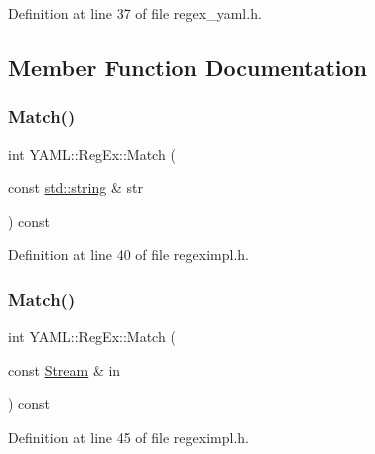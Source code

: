Definition at line 37 of file regex\+\_\+yaml.\+h.



\subsection{Member Function Documentation}
\mbox{\label{class_y_a_m_l_1_1_reg_ex_aec5a2989ce40d29a7ff9041943a957cf}} 
\subsubsection{\texorpdfstring{Match()}{Match()}\hspace{0.1cm}{\footnotesize\ttfamily [1/3]}}
{\footnotesize\ttfamily int Y\+A\+M\+L\+::\+Reg\+Ex\+::\+Match (\begin{DoxyParamCaption}\item[{const \mbox{\hyperlink{glad_8h_ac83513893df92266f79a515488701770}{std\+::string}} \&}]{str }\end{DoxyParamCaption}) const\hspace{0.3cm}{\ttfamily [inline]}}



Definition at line 40 of file regeximpl.\+h.

\mbox{\label{class_y_a_m_l_1_1_reg_ex_abaaa5a06ab887c7d345499ff5668606e}} 
\subsubsection{\texorpdfstring{Match()}{Match()}\hspace{0.1cm}{\footnotesize\ttfamily [2/3]}}
{\footnotesize\ttfamily int Y\+A\+M\+L\+::\+Reg\+Ex\+::\+Match (\begin{DoxyParamCaption}\item[{const \mbox{\hyperlink{class_y_a_m_l_1_1_stream}{Stream}} \&}]{in }\end{DoxyParamCaption}) const\hspace{0.3cm}{\ttfamily [inline]}}



Definition at line 45 of file regeximpl.\+h.

\mbox{\label{class_y_a_m_l_1_1_reg_ex_af6156571d13866b07908e2e6d611cc10}} 
